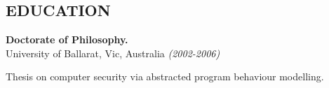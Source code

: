 \documentclass[margin]{res}
\begin{document}
\begin{resume}






\section{EDUCATION}

{\bf Doctorate of Philosophy.} \\
University of Ballarat, Vic, Australia {\em (2002-2006)}
\begin{list}{}{\leftmargin=1.5em \topsep=5pt \partopsep=0pt \parsep=2.5pt}
  \item Thesis on computer security via abstracted program behaviour modelling.
\end{list}


\end{resume}
\end{document}
